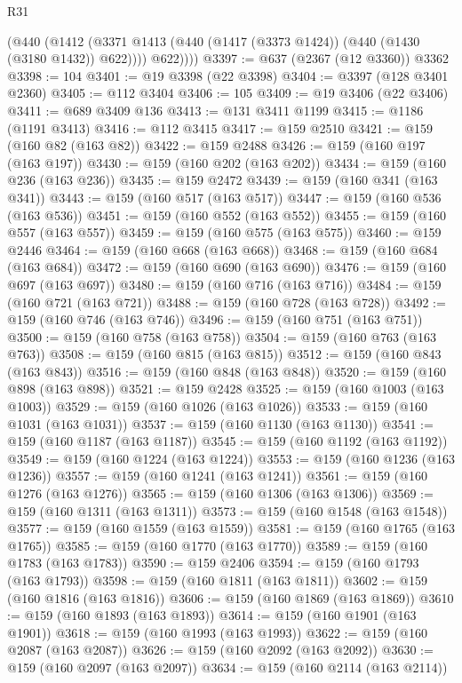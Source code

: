 \begin{lexlean}{R31}
\begin{coremodule}
          (@440
            (@1412 (@3371 @1413 (@440 (@1417 (@3373 @1424)) (@440 (@1430 (@3180 @1432)) @622))))
            @622))))
@3397 := @637 (@2367 (@12 @3360)) @3362
@3398 := 104
@3401 := @19 @3398 (@22 @3398)
@3404 := @3397 (@128 @3401 @2360)
@3405 := @112 @3404
@3406 := 105
@3409 := @19 @3406 (@22 @3406)
@3411 := @689 @3409 @136
@3413 := @131 @3411 @1199
@3415 := @1186 (@1191 @3413)
@3416 := @112 @3415
@3417 := @159 @2510
@3421 := @159 (@160 @82 (@163 @82))
@3422 := @159 @2488
@3426 := @159 (@160 @197 (@163 @197))
@3430 := @159 (@160 @202 (@163 @202))
@3434 := @159 (@160 @236 (@163 @236))
@3435 := @159 @2472
@3439 := @159 (@160 @341 (@163 @341))
@3443 := @159 (@160 @517 (@163 @517))
@3447 := @159 (@160 @536 (@163 @536))
@3451 := @159 (@160 @552 (@163 @552))
@3455 := @159 (@160 @557 (@163 @557))
@3459 := @159 (@160 @575 (@163 @575))
@3460 := @159 @2446
@3464 := @159 (@160 @668 (@163 @668))
@3468 := @159 (@160 @684 (@163 @684))
@3472 := @159 (@160 @690 (@163 @690))
@3476 := @159 (@160 @697 (@163 @697))
@3480 := @159 (@160 @716 (@163 @716))
@3484 := @159 (@160 @721 (@163 @721))
@3488 := @159 (@160 @728 (@163 @728))
@3492 := @159 (@160 @746 (@163 @746))
@3496 := @159 (@160 @751 (@163 @751))
@3500 := @159 (@160 @758 (@163 @758))
@3504 := @159 (@160 @763 (@163 @763))
@3508 := @159 (@160 @815 (@163 @815))
@3512 := @159 (@160 @843 (@163 @843))
@3516 := @159 (@160 @848 (@163 @848))
@3520 := @159 (@160 @898 (@163 @898))
@3521 := @159 @2428
@3525 := @159 (@160 @1003 (@163 @1003))
@3529 := @159 (@160 @1026 (@163 @1026))
@3533 := @159 (@160 @1031 (@163 @1031))
@3537 := @159 (@160 @1130 (@163 @1130))
@3541 := @159 (@160 @1187 (@163 @1187))
@3545 := @159 (@160 @1192 (@163 @1192))
@3549 := @159 (@160 @1224 (@163 @1224))
@3553 := @159 (@160 @1236 (@163 @1236))
@3557 := @159 (@160 @1241 (@163 @1241))
@3561 := @159 (@160 @1276 (@163 @1276))
@3565 := @159 (@160 @1306 (@163 @1306))
@3569 := @159 (@160 @1311 (@163 @1311))
@3573 := @159 (@160 @1548 (@163 @1548))
@3577 := @159 (@160 @1559 (@163 @1559))
@3581 := @159 (@160 @1765 (@163 @1765))
@3585 := @159 (@160 @1770 (@163 @1770))
@3589 := @159 (@160 @1783 (@163 @1783))
@3590 := @159 @2406
@3594 := @159 (@160 @1793 (@163 @1793))
@3598 := @159 (@160 @1811 (@163 @1811))
@3602 := @159 (@160 @1816 (@163 @1816))
@3606 := @159 (@160 @1869 (@163 @1869))
@3610 := @159 (@160 @1893 (@163 @1893))
@3614 := @159 (@160 @1901 (@163 @1901))
@3618 := @159 (@160 @1993 (@163 @1993))
@3622 := @159 (@160 @2087 (@163 @2087))
@3626 := @159 (@160 @2092 (@163 @2092))
@3630 := @159 (@160 @2097 (@163 @2097))
@3634 := @159 (@160 @2114 (@163 @2114))

\end{coremodule}
\end{lexlean}
